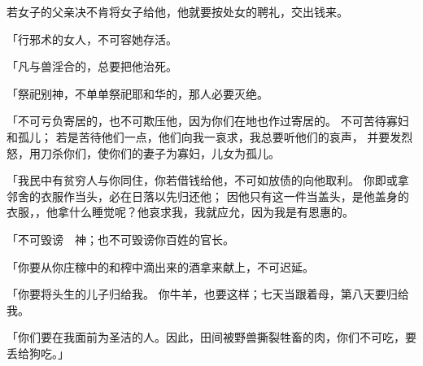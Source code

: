 {若女子的父亲决不肯将女子给他，他就要按处女的聘礼，交出钱来。
\par }{\PP {}「行邪术的女人，不可容她存活。
\par }{\PP {}「凡与兽淫合的，总要把他治死。
\par }{\PP {}「祭祀别神，不单单祭祀耶和华的，那人必要灭绝。
\par }{\PP {}「不可亏负寄居的，也不可欺压他，因为你们在{}地也作过寄居的。
不可苦待寡妇和孤儿；
若是苦待他们一点，他们向我一哀求，我总要听他们的哀声，
并要发烈怒，用刀杀你们，使你们的妻子为寡妇，儿女为孤儿。
\par }{\PP {}「我民中有贫穷人与你同住，你若借钱给他，不可如放债的向他取利。
你即或拿邻舍的衣服作当头，必在日落以先归还他；
因他只有这一件当盖头，是他盖身的衣服，{}，他拿什么睡觉呢？他哀求我，我就应允，因为我是有恩惠的。
\par }{\PP {}「不可毁谤　神；也不可毁谤你百姓的官长。
\par }{\PP {}「你要从你庄稼中的{}和{}榨中滴出来的酒拿来献上，不可迟延。
\par }{\PP 「你要将头生的儿子归给我。
你牛羊{}，也要这样；七天当跟着母，第八天要归给我。
\par }{\PP {}「你们要在我面前为圣洁的人。因此，田间被野兽撕裂牲畜的肉，你们不可吃，要丢给狗吃。」

}
